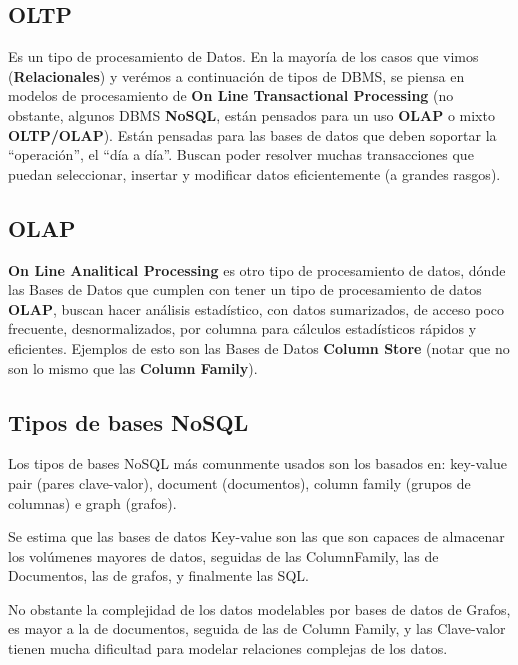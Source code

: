 \subsection*{OLTP} 
Es un tipo de procesamiento de Datos. En la mayoría de los casos que vimos (\textbf{Relacionales}) y verémos a continuación de tipos de DBMS, se piensa en modelos de procesamiento de \textbf{On Line Transactional Processing} (no obstante, algunos DBMS \textbf{NoSQL}, están pensados para un uso \textbf{OLAP} o mixto \textbf{OLTP/OLAP}). Están pensadas para las bases de datos que deben soportar la ``operación'', el ``día a día''. Buscan poder resolver muchas transacciones que puedan seleccionar, insertar y modificar datos eficientemente (a grandes rasgos).

\hypertarget{olap}{}
\subsection*{OLAP}
\textbf{On Line Analitical Processing} 
es otro tipo de procesamiento de datos, dónde las Bases de Datos que cumplen con tener un tipo de procesamiento de datos \textbf{OLAP}, buscan hacer análisis estadístico, con datos sumarizados, de acceso poco frecuente, desnormalizados, por columna para cálculos estadísticos rápidos y eficientes. Ejemplos de esto son las Bases de Datos \textbf{Column Store} (notar que no son lo mismo que las \textbf{Column Family}).

\subsection*{Tipos de bases NoSQL}
Los tipos de bases NoSQL más comunmente usados son los basados en: key-value pair (pares clave-valor), document (documentos), column family (grupos de columnas) e graph (grafos).

Se estima que las bases de datos Key-value son las que son capaces de almacenar los volúmenes mayores de datos, seguidas de las ColumnFamily, las de Documentos, las de grafos, y finalmente las SQL.

No obstante la complejidad de los datos modelables por bases de datos de Grafos, es mayor a la de documentos, seguida de las de Column Family, y las Clave-valor tienen mucha dificultad para modelar relaciones complejas de los datos.

